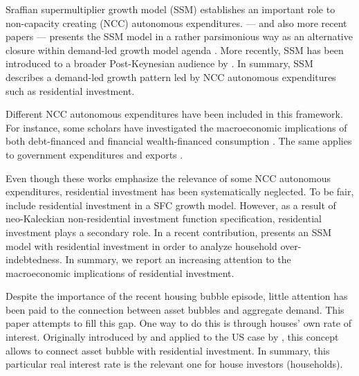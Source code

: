 \documentclass[11pt]{article}
\begin{document}
Sraffian supermultiplier growth model (SSM) establishes an important role to non-capacity creating (NCC) autonomous expenditures.
\textcite{serrano_long_1995} --- and also more recent papers \cite{freitas_growth_2015} --- presents the SSM model in a rather parsimonious way as an alternative closure within demand-led growth model agenda \cite{serrano_sraffian_2017}.
More recently, SSM has been introduced to a broader Post-Keynesian audience by \textcites{allain_tackling_2015}{lavoie_post-keynesian_2015}{lavoie_convergence_2016}.
In summary,  SSM describes a demand-led growth pattern led by NCC autonomous expenditures such as residential investment.


Different NCC autonomous expenditures have been included in this framework. 
For instance, some scholars have investigated the macroeconomic implications of both debt-financed \cites{pariboni_autonomous_2015}{fagundes_role_2017}{mandarino-2020-worker-debt} and financial wealth-financed consumption \cite{brochier_supermultiplier_2018}.
The same applies to government expenditures \cites{allain_tackling_2015}{bougrine_autonomous_2020} and exports \cite{nah_long-run_2017}.

Even though these works emphasize the relevance of some NCC autonomous expenditures, residential investment has been systematically neglected.
To be fair, \textcites{zezza_u.s._2008}{nikolaidi_securitisation_2015} include residential investment in a SFC growth model.
However, as a result of neo-Kaleckian non-residential investment function specification, residential investment plays a secondary role.
In a recent contribution, \textcite{dejuan_supermultiplier-cum-finance_2018} presents an SSM model with residential investment in order to analyze household over-indebtedness.
In summary, we report an increasing attention to the macroeconomic implications of residential investment.

Despite the importance of the recent housing bubble episode, little attention has been paid to the connection between asset bubbles and aggregate demand.
This paper attempts to fill this gap. 
One way to do this is through houses' own rate of interest.
Originally introduced by \textcite{Sraffa_Own_1932} and applied to the US case by \textcite{teixeira_crescimento_2015}, this concept allows to connect asset bubble with residential investment.
In summary, this particular real interest rate is the relevant one for house investors (households). 
\end{document}
